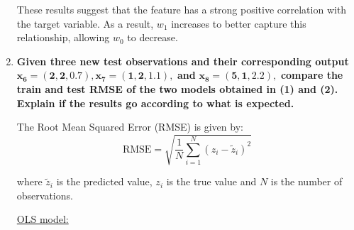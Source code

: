 \documentclass[12pt]{article}
\begin{document}
\begin{enumerate}
    These results suggest that the feature has a strong positive correlation with the target variable. As a result, $w_1$ increases to better capture this relationship, allowing $w_0$
    to decrease.

    \vspace{10pt}
    \item \textbf{Given three new test observations and their corresponding output\\}
    $\mathbf{x_6 = (2,2,0.7), x_7 = (1,2,1.1),}$ \textbf{ and } $\mathbf{x_8 = (5,1,2.2),}$
    \textbf{compare the train and test RMSE of the two models obtained in (1) and (2). Explain if the results go according to what is expected.}    

    \vspace{10pt}
    The Root Mean Squared Error (RMSE) is given by:
    \begin{equation*}
        \text{RMSE} = \sqrt{\frac{1}{N} \sum_{i=1}^{N} (z_{i} - \tilde{z}_{i})^2}
    \end{equation*}

    where $\tilde{z}_{i}$ is the predicted value, $z_{i}$ is the true value and $N$ is the number of observations.

    \vspace{10pt}
    \underline{OLS model:}


\end{enumerate}
\end{document}
